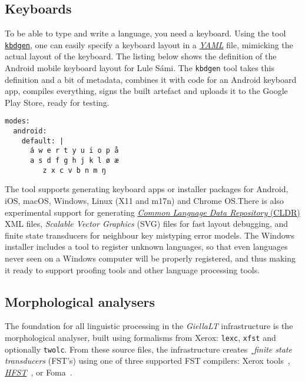 \documentclass[free]{flammie}
\begin{document}
\subsection{Keyboards}

To be able to type and write a language, you need a keyboard. Using the tool
\texttt{\href{https://github.com/divvun/kbdgen}{kbdgen}}, one can easily specify
a keyboard layout in a \textit{\href{https://yaml.org}{YAML}} file, mimicking
the actual layout of the keyboard. The listing below shows the definition of the
Android mobile keyboard layout for Lule Sámi. The \texttt{kbdgen} tool takes
this definition and a bit of metadata, combines it with code for an Android
keyboard app, compiles everything, signs the built artefact and uploads it to
the Google Play Store, ready for testing.


\begin{lstlisting}[frame=single]
modes:
  android:
    default: |
      á w e r t y u i o p å
      a s d f g h j k l ø æ
         z x c v b n m ŋ
\end{lstlisting}












The tool supports generating keyboard apps or installer packages for Android,
iOS, macOS, Windows, Linux (X11 and m17n) and Chrome OS.\@ There is also
experimental support for generating
\href{https://cldr.unicode.org}{\textit{Common Language Data Repository} (CLDR)}
XML files, \textit{Scalable Vector Graphics} (SVG) files for fast layout
debugging, and finite state transducers for neighbour key mistyping error
models. The Windows installer includes a tool to register unknown languages, so
that even languages never seen on a Windows computer will be properly
registered, and thus making it ready to support proofing tools and other
language processing tools.




\subsection{Morphological analysers}\label{section.morphanalysis}

The foundation for all linguistic processing in the \textit{GiellaLT}
infrastructure is the morphological analyser, built using formalisms from Xerox:
\texttt{lexc}, \texttt{xfst} and optionally \texttt{twolc}. From these source
files, the infrastructure creates ¸\textit{finite state transducers} (FST's)
using one of three supported FST compilers: Xerox
tools~\cite{beesley2003finite},
\textit{\href{https://hfst.github.io}{HFST}}~\cite{linden2013hfst}, or
Foma~\cite{hulden2009foma}.
\end{document}
